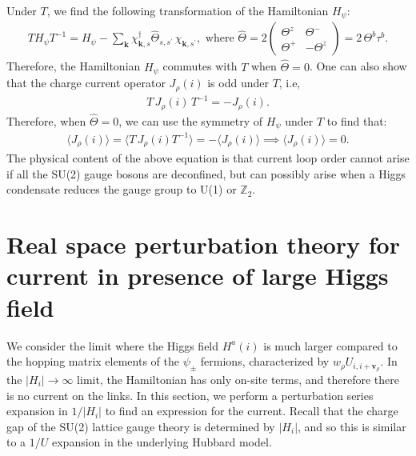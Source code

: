 \documentclass[aps,prb,preprint,onecolumn,citeautoscript,superscriptaddress,footinbib,
eqsecnum]{revtex4-1}
\def\bea{\begin{eqnarray}}
\def\eea{\end{eqnarray}}
\def \k{{\bm k}}
\def \vr{{\bm v}_\rho}
\begin{document}
Under $T$, we find the following transformation of the Hamiltonian $H_{\psi}$:
\bea
 T H_{\psi}T^{-1} = H_{\psi} - \sum_{\k} \chi^{\dagger}_{\k,s} \hat{\Theta}_{s,s^{\prime}} \, \chi_{\k,s^\prime}, \text{ where } \hat{\Theta} = 2 \begin{pmatrix}
\Theta^z & \Theta^- \\
\Theta^+ & -\Theta^z 
\end{pmatrix} = 2 \, \Theta^b \tau^b.
\eea
Therefore, the Hamiltonian $H_{\psi}$ commutes with $T$ when $\hat{\Theta} =0$. One can also show that the charge current operator $J_{\rho}(i)$ is odd under $T$, i.e,
\bea
T \, J_{\rho}(i) \, T^{-1} = - J_{\rho}(i).
\eea
Therefore, when $\hat{\Theta} = 0$, we can use the symmetry of $H_{\psi}$ under $T$ to find that:
\bea
\langle J_{\rho}(i) \rangle  = \langle T \, J_{\rho}(i) T^{-1} \rangle = - \langle J_{\rho}(i) \rangle \implies \langle J_{\rho}(i) \rangle = 0.
\eea
The physical content of the above equation is that current loop order cannot arise if all the SU(2) gauge bosons are deconfined, but can possibly arise when a Higgs condensate reduces the gauge group to U(1) or $\mathbb{Z}_2$.

\section{Real space perturbation theory for current in presence of large Higgs field}
\label{app:realspace}

We consider the limit where the Higgs field $H^a(i)$ is much larger compared to the hopping matrix elements of the $\psi_\pm$ fermions, characterized by $w_{\rho} U_{i, i + \vr}$. In the $|H_i| \rightarrow \infty$ limit, the Hamiltonian has only on-site terms, and therefore there is no current on the links. In this section, we perform a perturbation series expansion in $1/|H_i|$ to find an expression for the current. Recall that the charge gap of the SU(2) lattice gauge theory
is determined by $|H_i|$, and so this is similar to a $1/U$ expansion in the underlying Hubbard model.
\end{document}
